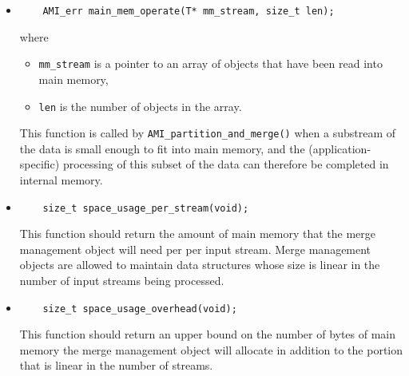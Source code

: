 \begin{itemize}
    \item {}
\begin{lstlisting}
    AMI_err main_mem_operate(T* mm_stream, size_t len);
\end{lstlisting}
\noindent
where
    \begin{itemize}
        \item \lstinline|mm_stream| is a pointer to an array
        of objects that have been read into main memory,
        \item \lstinline|len| is the number of objects in the
        array.
    \end{itemize}
    
    This function is called by
    \lstinline|AMI_partition_and_merge()| when a substream of
    the data is small enough to fit into main memory, and
    the (application-specific) processing of this subset of
    the data can therefore be completed in internal memory.

    
    \item {}
\begin{lstlisting}
    size_t space_usage_per_stream(void);
\end{lstlisting}
    This function should return the amount of main memory
    that the merge management object will need per per input
    stream. Merge management objects are allowed to maintain
    data structures whose size is linear in the number of
    input streams being processed.

    \item {}
\begin{lstlisting}
    size_t space_usage_overhead(void);
\end{lstlisting}
    This function should return an upper bound on the number
    of bytes of main memory
    the merge management object will allocate in addition to
    the portion that is linear in the number of streams.
    
\end{itemize}




